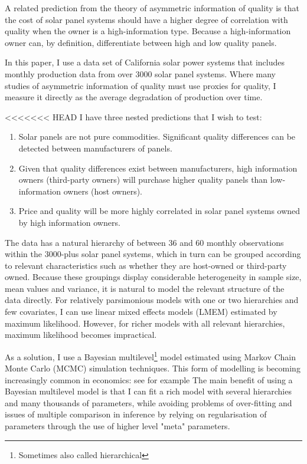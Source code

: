 \documentclass[12pt]{article}
\begin{document}
A related prediction from the theory of asymmetric information of quality is that the cost of solar panel systems should have a higher degree of correlation with quality when the owner is a high-information type. Because a high-information owner can, by definition, differentiate between high and low quality panels.

In this paper, I use a data set of California solar power systems that includes monthly production data from over 3000 solar panel systems. Where many studies of asymmetric information of quality must use proxies for quality, I measure it directly as the average degradation of production over time.

<<<<<<< HEAD
I have three nested predictions that I wish to test:

\begin{enumerate}
  \item Solar panels are not pure commodities. Significant quality differences can be detected between manufacturers of panels.
  \item Given that quality differences exist between manufacturers, high information owners (third-party owners) will purchase higher quality panels than low-information owners (host owners).
  \item Price and quality will be more highly correlated in solar panel systems owned by high information owners.
\end{enumerate}

The data has a natural hierarchy of between 36 and 60 monthly observations within the 3000-plus solar panel systems, which in turn can be grouped according to relevant characteristics such as whether they are host-owned or third-party owned. Because these groupings display considerable heterogeneity in sample size, mean values and variance, it is natural to model the relevant structure of the data directly. For relatively parsimonious models with one or two hierarchies and few covariates, I can use linear mixed effects models (LMEM) estimated by maximum likelihood. However, for richer models with all relevant hierarchies, maximum likelihood becomes impractical.

As a solution, I use a Bayesian multilevel\footnote{Sometimes also called hierarchical} model estimated using Markov Chain Monte Carlo (MCMC) simulation techniques. This form of modelling is becoming increasingly common in economics: see for example \citet{meager_understanding_2018} The main benefit of using a Bayesian multilevel model is that I can fit a rich model with several hierarchies and many thousands of parameters, while avoiding problems of over-fitting and issues of multiple comparison in inference by relying on regularisation of parameters through the use of higher level "meta" parameters.
\end{document}
